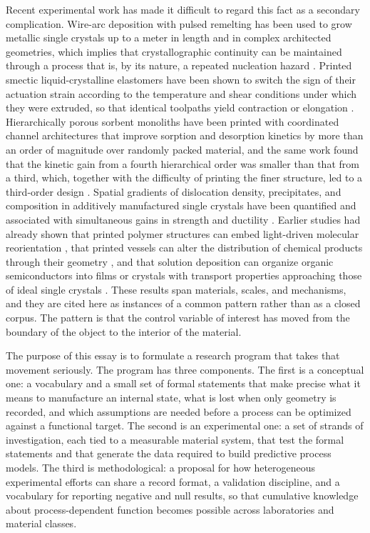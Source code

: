 \documentclass[11pt]{article}
\theoremstyle{definition}
\begin{document}
Recent experimental work has made it difficult to regard this fact as a secondary complication. Wire-arc deposition with pulsed remelting has been used to grow metallic single crystals up to a meter in length and in complex architected geometries, which implies that crystallographic continuity can be maintained through a process that is, by its nature, a repeated nucleation hazard \cite{liu2026,rohrer2026}. Printed smectic liquid-crystalline elastomers have been shown to switch the sign of their actuation strain according to the temperature and shear conditions under which they were extruded, so that identical toolpaths yield contraction or elongation \cite{lee2026}. Hierarchically porous sorbent monoliths have been printed with coordinated channel architectures that improve sorption and desorption kinetics by more than an order of magnitude over randomly packed material, and the same work found that the kinetic gain from a fourth hierarchical order was smaller than that from a third, which, together with the difficulty of printing the finer structure, led to a third-order design \cite{bai2026}. Spatial gradients of dislocation density, precipitates, and composition in additively manufactured single crystals have been quantified and associated with simultaneous gains in strength and ductility \cite{guo2025}. Earlier studies had already shown that printed polymer structures can embed light-driven molecular reorientation \cite{vanoosten2009}, that printed vessels can alter the distribution of chemical products through their geometry \cite{symes2012}, and that solution deposition can organize organic semiconductors into films or crystals with transport properties approaching those of ideal single crystals \cite{niazi2015,rigas2016}. These results span materials, scales, and mechanisms, and they are cited here as instances of a common pattern rather than as a closed corpus. The pattern is that the control variable of interest has moved from the boundary of the object to the interior of the material.

The purpose of this essay is to formulate a research program that takes that movement seriously. The program has three components. The first is a conceptual one: a vocabulary and a small set of formal statements that make precise what it means to manufacture an internal state, what is lost when only geometry is recorded, and which assumptions are needed before a process can be optimized against a functional target. The second is an experimental one: a set of strands of investigation, each tied to a measurable material system, that test the formal statements and that generate the data required to build predictive process models. The third is methodological: a proposal for how heterogeneous experimental efforts can share a record format, a validation discipline, and a vocabulary for reporting negative and null results, so that cumulative knowledge about process-dependent function becomes possible across laboratories and material classes.
\end{document}
